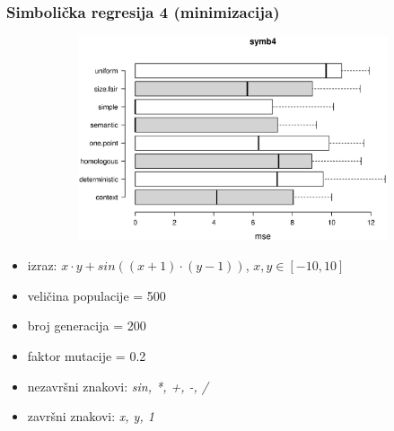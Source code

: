\documentclass{beamer}
\begin{document}
\begin{frame}
\frametitle{Simbolička regresija 4 (minimizacija)}


\begin{figure}[!htb]
\begin{figure}[H]
	\centering
	\includegraphics[trim=4cm 5.5cm 0cm 3.5cm, scale=0.3]{./boxPlots/symb4.eps}
\end{figure}

\endminipage
{}
\endminipage
\end{figure}

\begin{itemize}
\item{izraz: $x \cdot y + sin((x+1) \cdot (y-1))$, $x, y \in [-10, 10]$}
\item{veličina populacije = 500}
\item{broj generacija = 200}
\item{faktor mutacije = 0.2}
\item{nezavršni znakovi: \textit{sin, *, +, -, /}}
\item{završni znakovi: \textit{x, y, 1}}
\end{itemize}
\end{frame}
\end{document}
